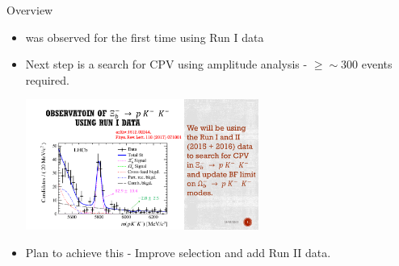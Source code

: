 \documentclass{beamer}
\begin{document}
\begin{frame}{Overview}
  \begin{itemize}
  \item {} was observed for the first time using Run I data
  \item Next step is a search for CPV using amplitude analysis - $\geq \sim300$ events required.
    \begin{center}\includegraphics[width=0.6\textwidth]{XiBFit.pdf}\end{center}
  \item Plan to achieve this - Improve selection and add Run II data.
  \end{itemize}
\end{frame}
\end{document}
